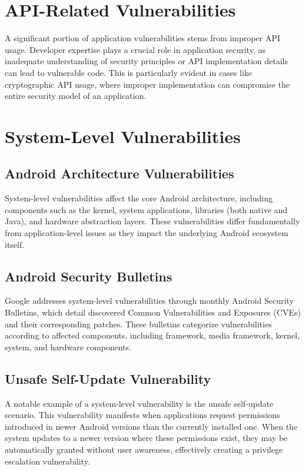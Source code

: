 \documentclass{article}
\begin{document}
\section{API-Related Vulnerabilities}
A significant portion of application vulnerabilities stems from improper API usage. Developer expertise plays a crucial role in application security, as inadequate understanding of security principles or API implementation details can lead to vulnerable code. This is particularly evident in cases like cryptographic API usage, where improper implementation can compromise the entire security model of an application.

\section{System-Level Vulnerabilities}
\subsection{Android Architecture Vulnerabilities}
System-level vulnerabilities affect the core Android architecture, including components such as the kernel, system applications, libraries (both native and Java), and hardware abstraction layers. These vulnerabilities differ fundamentally from application-level issues as they impact the underlying Android ecosystem itself.

\subsection{Android Security Bulletins}
Google addresses system-level vulnerabilities through monthly Android Security Bulletins, which detail discovered Common Vulnerabilities and Exposures (CVEs) and their corresponding patches. These bulletins categorize vulnerabilities according to affected components, including framework, media framework, kernel, system, and hardware components.

\subsection{Unsafe Self-Update Vulnerability}
A notable example of a system-level vulnerability is the unsafe self-update scenario. This vulnerability manifests when applications request permissions introduced in newer Android versions than the currently installed one. When the system updates to a newer version where these permissions exist, they may be automatically granted without user awareness, effectively creating a privilege escalation vulnerability.
\end{document}
